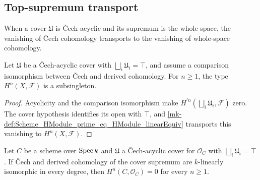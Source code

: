 \subsection{Top-supremum transport}

When a cover \(\mathfrak U\) is Čech-acyclic and its supremum is the whole space, the vanishing of Čech cohomology transports to the vanishing of whole-space cohomology.

\begin{theorem}\label{mk-thm:Scheme_subsingleton_HModule_of_isCechAcyclicCover_top}
  \leanok


  Let \(\mathfrak U\) be a Čech-acyclic cover with \(\bigsqcup_i \mathfrak U_i = \top\), and assume a comparison isomorphism between Čech and derived cohomology. For \(n \ge 1\), the type \(H^{n}(X, \mathcal F)\) is a subsingleton.
\end{theorem}

\begin{proof}
  \leanok


Acyclicity and the comparison isomorphism make \(H^{\prime n}(\bigsqcup_i\mathfrak U_i,\mathcal F)\) zero. The cover hypothesis identifies its open with \(\top\), and \ref{mk-def:Scheme_HModule_prime_eq_HModule_linearEquiv} transports this vanishing to \(H^n(X,\mathcal F)\).
\end{proof}

\begin{theorem}\label{mk-thm:Scheme_subsingleton_HModule_of_isCechAcyclicCover_top_curve}
  \leanok


  Let \(C\) be a scheme over \(\operatorname{Spec} k\) and \(\mathfrak U\) a \v{C}ech-acyclic cover for \(\mathcal O_C\) with \(\bigsqcup_i\mathfrak U_i=\top\). If \v{C}ech and derived cohomology of the cover supremum are \(k\)-linearly isomorphic in every degree, then \(H^n(C,\mathcal O_C)=0\) for every \(n\geq 1\).
\end{theorem}

